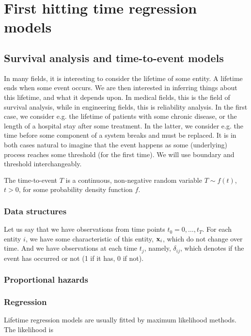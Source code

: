 \chapter{First hitting time regression models}

\section{Survival analysis and time-to-event models}\label{sec:survival}
In many fields, it is interesting to consider the lifetime of some entity. A lifetime ends when some event occurs. We are then interested in inferring things about this lifetime, and what it depends upon. In medical fields, this is the field of survival analysis, while in engineering fields, this is reliability analysis. In the first case, we consider e.g. the lifetime of patients with some chronic disease, or the length of a hospital stay after some treatment. In the latter, we consider e.g. the time before some component of a system breaks and must be replaced. It is in both cases natural to imagine that the event happens as some (underlying) process reaches some threshold (for the first time). We will use boundary and threshold interchangeably.

The time-to-event $T$ is a continuous, non-negative random variable $T\sim f(t)$, $t>0$, for some probability density function $f$.


\subsection{Data structures}
Let us say that we have observations from time points $t_0=0, \dots, t_T$. For each entity $i$, we have some characteristic of this entity, $\mathbf{x}_i$, which do not change over time. And we have observations at each time $t_j$, namely, $\delta_{ij}$, which denotes if the event has occurred or not (1 if it has, 0 if not).

\subsection{Proportional hazards}

\subsection{Regression}\label{sec:surv-reg}
Lifetime regression models are usually fitted by maximum likelihood methods. The likelihood is

